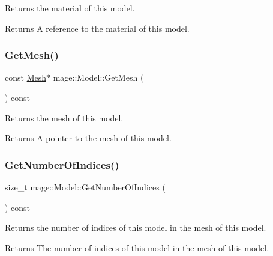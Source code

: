 Returns the material of this model.

\begin{DoxyReturn}{Returns}
A reference to the material of this model. 
\end{DoxyReturn}
\hypertarget{classmage_1_1_model_a5aba7071fb98060f9a450abad4d082cc}{}\label{classmage_1_1_model_a5aba7071fb98060f9a450abad4d082cc} 
\subsubsection{\texorpdfstring{Get\+Mesh()}{GetMesh()}}
{\footnotesize\ttfamily const \hyperlink{classmage_1_1_mesh}{Mesh}$\ast$ mage\+::\+Model\+::\+Get\+Mesh (\begin{DoxyParamCaption}{ }\end{DoxyParamCaption}) const\hspace{0.3cm}{\ttfamily [noexcept]}}

Returns the mesh of this model.

\begin{DoxyReturn}{Returns}
A pointer to the mesh of this model. 
\end{DoxyReturn}
\hypertarget{classmage_1_1_model_a37c9814a445159fd742bcc1b9a5a7b94}{}\label{classmage_1_1_model_a37c9814a445159fd742bcc1b9a5a7b94} 
\subsubsection{\texorpdfstring{Get\+Number\+Of\+Indices()}{GetNumberOfIndices()}}
{\footnotesize\ttfamily size\+\_\+t mage\+::\+Model\+::\+Get\+Number\+Of\+Indices (\begin{DoxyParamCaption}{ }\end{DoxyParamCaption}) const\hspace{0.3cm}{\ttfamily [noexcept]}}

Returns the number of indices of this model in the mesh of this model.

\begin{DoxyReturn}{Returns}
The number of indices of this model in the mesh of this model. 
\end{DoxyReturn}
\hypertarget{classmage_1_1_model_a876fcfe369f12e2d7edb6b533dd06252}{}\label{classmage_1_1_model_a876fcfe369f12e2d7edb6b533dd06252} 
